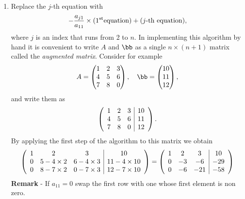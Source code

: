 \begin{enumerate}

\item Replace the $j$-th equation with
%
  \begin{equation*}
    -\frac{a_{j 1}}{a_{1 1}} \times ( 1^{\rm st} \text{equation} ) +
    ( j\text{-th equation} ) ,
  \end{equation*}
%
where $j$ is an index that runs from 2 to $n$.  In implementing this
algorithm by hand it is convenient to write $A$ and $\bb$ as a single
$n \times (n+1)$ matrix called the \textit{augmented matrix}.
Consider for example
%
\begin{equation*}
  A =
  \begin{pmatrix}
    1 & 2 & 3 \\ 4 & 5 & 6 \\ 7 & 8 & 0
  \end{pmatrix}
 , \quad
  \bb =
  \begin{pmatrix}
    10 \\ 11 \\ 12
  \end{pmatrix},
\end{equation*}
%
and write them as
%
\begin{equation*}
\left (
  \begin{array}{c c c|c}
   1 & 2 & 3 & 10 \\ 4 & 5 & 6 & 11 \\ 7 & 8 & 0 & 12 \\
  \end{array}
 \right ) .
\end{equation*}
%
By applying the first step of the algorithm to this matrix we obtain
%
\begin{equation*}
  \left (
  \begin{array}{c c c|c}
   1 & 2 & 3 & 10 \\
   0 & 5 - 4 \times 2 & 6 - 4 \times 3 & 11 - 4 \times 10 \\
   0 & 8 - 7 \times 2 & 0 - 7  \times 3 & 12 - 7 \times 10
  \end{array}
 \right ) =
 \left (
  \begin{array}{c c c|c}
   1 & 2 & 3 & 10 \\
   0 & -3 & -6 & -29 \\
   0 & -6 & -21 & -58
  \end{array}
 \right )
\end{equation*}
%
{\bf Remark} - If $a_{1 1}=0$ swap the first row with one whose first
element is non zero.


\end{enumerate}
